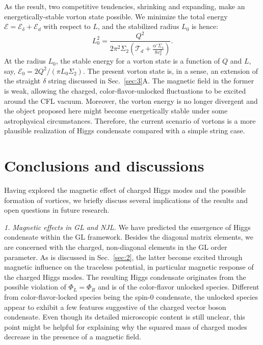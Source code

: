 \documentclass[12pt]{article}
\begin{document}
As the result, two competitive tendencies, shrinking and expanding, 
make an energetically-stable vorton state possible. We minimize the total energy 
$\mathcal{E} = \mathcal{E}_\delta + \mathcal{E}_d$ with respect to $L$, and the stabilized radius 
$L_0$ is hence:
\begin{equation}
\label{eq:vortonr}
 L_0^2 = \frac{Q^2}{2\pi^2\Sigma_2(\mathcal{T}_d +
   \frac{\alpha' \Sigma_4}{8v_\delta^2})}.
\end{equation}
At the radius $L_0$, the stable energy for a vorton state is a function of $Q$ and $L$, say, 
$\mathcal{E}_0 = 2 Q^2/(\pi L_0 \Sigma_2)$.
The present vorton state is, in a sense, an extension of the straight $\delta$ string discussed 
in Sec.~\ref{sec:3}A. The magnetic field in the former is weak, allowing the charged, 
color-flavor-unlocked fluctuations to be excited around the CFL vacuum.
Moreover, the vorton energy is no longer divergent and the object proposed here might become 
energetically stable under some astrophysical circumstances. Therefore, the current scenario of vortons 
is a more plausible realization of Higgs condensate compared with a simple string case.


\vspace{0.2cm}
\section{\bf Conclusions and discussions}
\label{sec:4}
\vspace{0.2cm}

Having explored the magnetic effect of charged Higgs modes and the possible formation of vortices, 
we briefly discuss several implications of the results and open questions in future research.

\emph{1. Magnetic effects in GL and NJL.}
We have predicted the emergence of Higgs condensate within the GL framework.
Besides the diagonal matrix elements, we are concerned with the charged, non-diagonal elements in the GL 
order parameter.
As is discussed in Sec.~\ref{sec:2}, the latter become excited through magnetic influence on
the traceless potential, in particular magnetic response of the charged Higgs modes.
The resulting Higgs condensate originates from the possible violation of $\Phi_L=\Phi_R$ and is of the 
color-flavor unlocked species.
Different from color-flavor-locked species being the spin-$0$ condensate, 
the unlocked species appear to exhibit a few features suggestive of the charged vector boson condensate.
Even though its detailed microscopic content is still unclear, this point might be helpful for explaining why
the squared mass of charged modes decrease in the presence of a magnetic field.
\end{document}
